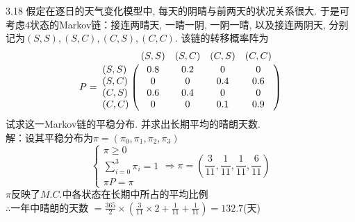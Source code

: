 3.18 假定在逐日的天气变化模型中, 每天的阴晴与前两天的状况关系很大. 于是可考虑$4$状态的Markov链：接连两晴天, 一晴一阴, 一阴一晴, 以及接连两阴天, 分别记为$(S, S), (S, C), (C, S), (C, C)$. 该链的转移概率阵为
\[
P =
\bordermatrix{
	~ & (S,S) & (S,C) & (C,S) & (C,C) \cr
	(S,S) & 0.8 & 0.2 & 0 & 0 \cr
	(S,C) & 0 & 0 & 0.4 & 0.6 \cr
	(C,S) & 0.6 & 0.4 & 0 & 0 \cr
	(C,C) & 0 & 0 & 0.1 & 0.9 \cr
}
\]
试求这一Markov链的平稳分布. 并求出长期平均的晴朗天数.\\
解：设其平稳分布为$\pi = (\pi_0, \pi_1, \pi_2, \pi_3)$\\
\[
\begin{cases}
\pi \geqslant 0\\
\sum\limits^3_{i=0} \pi_i = 1\\
\pi P = \pi
\end{cases}
\Rightarrow
\pi = (\frac{3}{11}, \frac{1}{11}, \frac{1}{11}, \frac{6}{11})
\]
$\pi$反映了$M.C.$中各状态在长期中所占的平均比例\\
$\therefore$一年中晴朗的天数 $ = \frac{365}{2} \times \left(\frac{3}{11} \times 2 + \frac{1}{11} + \frac{1}{11}\right) = 132.7$(天)


